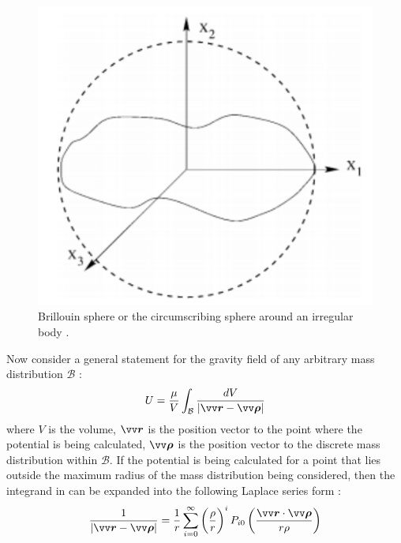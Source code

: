 \begin{figure}[htb]
\centering
\captionsetup{justification=centering}
\includegraphics[width=\textwidth, height=0.25\textheight, keepaspectratio=true]{Brillouin_sphere.pdf}
\caption{Brillouin sphere or the circumscribing sphere around an irregular body \parencite{romain2001ellipsoidal}.}
\label{fig:brillouin_sphere}
\end{figure}
\FloatBarrier
Now consider a general statement for the gravity field of any arbitrary mass distribution $\mathcal{B}$ \parencite{scheeresBook}:
\begin{align}
    U = \frac{\mu}{V} \int_{\mathcal{B}} \frac{dV}{|\bvector{r} - \bvector{\rho}|}
    \label{eqn:general_gravity_field}
\end{align}
where $V$ is the volume, $\bvector{r}$ is the position vector to the point where the potential is being calculated, $\bvector{\rho}$ is the position vector to the discrete mass distribution within $\mathcal{B}$. If the potential is being calculated for a point that lies outside the maximum radius of the mass distribution being considered, then the integrand in  can be expanded into the following Laplace series form \parencite{scheeresBook}:
\begin{align}
    \frac{1}{|\bvector{r} - \bvector{\rho}|} = \frac{1}{r} \sum_{i=0}^{\infty} \left(\frac{\rho}{r}\right)^i P_{i0} \left(\frac{\bvector{r} \cdot \bvector{\rho}}{r\rho}\right)
    \label{eqn:general_grav_term_laplace_series}
\end{align}
